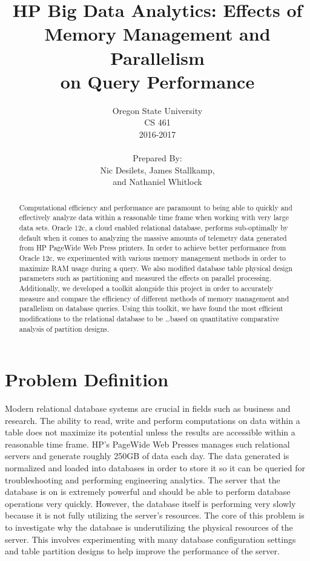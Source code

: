 \documentclass[draftclsnofoot, onecolumn, 10pt]{IEEEtran}
\title{\huge HP Big Data Analytics: Effects of\\Memory Management and Parallelism\\on Query Performance}
\author{Oregon State University\\CS 461\\2016-2017\\\\Prepared By:\\Nic Desilets, James Stallkamp,\\and Nathaniel Whitlock}
\begin{document}
\begin{titlingpage}
    \maketitle
    
    \begin{abstract}
		Computational efficiency and performance are paramount to being able to quickly and effectively analyze data within a reasonable time frame when working with very large data sets. 
		Oracle 12c, a cloud enabled relational database, performs sub-optimally by default when it comes to analyzing the massive amounts of telemetry data generated from HP PageWide Web Press printers.
		In order to achieve better performance from Oracle 12c, we experimented with various memory management methods in order to maximize RAM usage during a query.
		We also modified database table physical design parameters such as partitioning and measured the effects on parallel processing.
		Additionally, we developed a toolkit alongside this project in order to accurately measure and compare the efficiency of different methods of memory management and parallelism on database queries.
		Using this toolkit, we have found the most efficient modifications to the relational database to be \ldots based on quantitative comparative analysis of partition designs.
    \end{abstract}
\end{titlingpage}


\section*{Problem Definition}
Modern relational database systems are crucial in fields such as business and research.
The ability to read, write and perform computations on data within a table does not maximize its potential unless the results are accessible within a reasonable time frame.
HP’s PageWide Web Presses manages such relational servers and generate roughly 250GB of data each day.
The data generated is normalized and loaded into databases in order to store it so it can be queried for troubleshooting and performing engineering analytics.
The server that the database is on is extremely powerful and should be able to perform database operations very quickly. However, the database itself is performing very slowly because it is not fully utilizing the server's resources.
The core of this problem is to investigate why the database is underutilizing the physical resources of the server.
This involves experimenting with many database configuration settings and table partition designs to help improve the performance of the server. 
\end{document}
